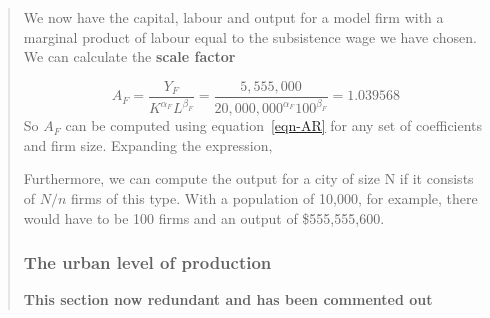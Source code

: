 \begin{enumerate}
\begin{quotation}
We now have the capital, labour and output for a model firm with a marginal product of labour  equal to the subsistence wage we have chosen. We can calculate the \textbf{scale factor} 

\begin{equation}  
A_F= \frac{Y_F}{K^{\alpha_F} L^{\beta_F}}=\frac{5,555,000}{20,000,000^{\alpha_F} 100^{\beta_F}} = 1.039568 \label{eqn-AR}\end{equation} 
So $A_F$ can be computed using equation~\ref{eqn-AR} for any set of coefficients and firm size. Expanding the expression,


Furthermore, we can compute the output for a city of size N if it consists of $N/n$ firms of this type. With a population of 10,000, for example,  there would have to be  100 firms and an output of \$555,555,600. 

 \subsubsection{The urban level of production}
 \textbf{This section now redundant and has been commented out}





\end{quotation}
\end{enumerate}
